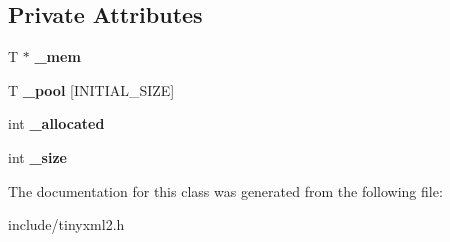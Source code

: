 \subsection*{Private Attributes}
\begin{DoxyCompactItemize}
\item 
\mbox{\label{classtinyxml2_1_1DynArray_ac8511e876d55f3ec64277516273434fd}} 
T $\ast$ {\bfseries \+\_\+mem}
\item 
\mbox{\label{classtinyxml2_1_1DynArray_a26ed1f7dab98229d2ed867a07ee427df}} 
T {\bfseries \+\_\+pool} \mbox{[}I\+N\+I\+T\+I\+A\+L\+\_\+\+S\+I\+ZE\mbox{]}
\item 
\mbox{\label{classtinyxml2_1_1DynArray_aee2522b771ca30bc09bff4d5b3176bfc}} 
int {\bfseries \+\_\+allocated}
\item 
\mbox{\label{classtinyxml2_1_1DynArray_a40f0578cc1912eed17fb29f64daf6ae9}} 
int {\bfseries \+\_\+size}
\end{DoxyCompactItemize}


The documentation for this class was generated from the following file\+:\begin{DoxyCompactItemize}
\item 
include/tinyxml2.\+h\end{DoxyCompactItemize}
